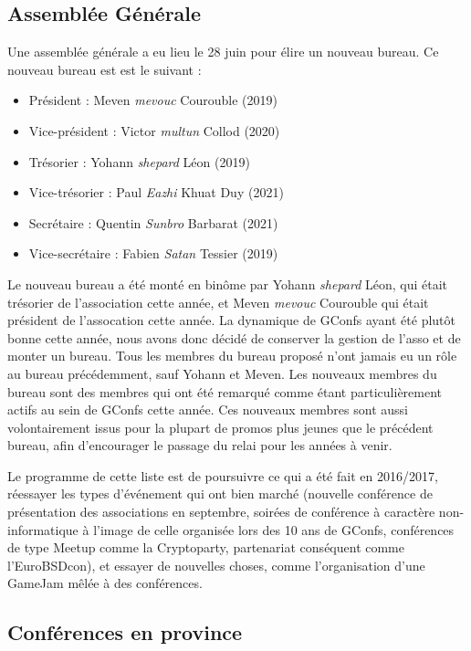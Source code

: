 \documentclass[12pt,a4paper]{article}
\begin{document}
\subsection{Assemblée Générale}

Une assemblée générale a eu lieu le 28 juin pour élire un nouveau bureau. Ce nouveau bureau est est le suivant :

\begin{itemize}
\item Président : Meven \emph{mevouc} Courouble (2019)
\item Vice-président : Victor \emph{multun} Collod (2020)
\item Trésorier : Yohann \emph{shepard} Léon (2019)
\item Vice-trésorier : Paul \emph{Eazhi} Khuat Duy (2021)
\item Secrétaire : Quentin \emph{Sunbro} Barbarat (2021)
\item Vice-secrétaire : Fabien \emph{Satan} Tessier (2019)
\end{itemize}

Le nouveau bureau a été monté en binôme par Yohann \emph{shepard} Léon, qui était
trésorier de l'association cette année, et Meven \emph{mevouc} Courouble qui était président de l'assocation cette année. La dynamique de GConfs ayant été plutôt
bonne cette année, nous avons donc décidé de  conserver la gestion de l'asso et de monter un bureau.
Tous les membres du bureau proposé n'ont jamais eu un rôle au bureau
précédemment, sauf Yohann et Meven. Les nouveaux membres du bureau sont des membres
qui ont été remarqué comme étant particulièrement actifs au sein de GConfs cette année. Ces nouveaux membres sont aussi volontairement issus pour la plupart de promos plus jeunes que le précédent bureau, afin d'encourager le passage du relai pour les années à venir.

Le programme de cette liste est de poursuivre ce qui a été fait en
2016/2017, réessayer les types d'événement qui ont bien marché
(nouvelle conférence de présentation des associations en septembre,
soirées de conférence à caractère non-informatique à l'image de celle organisée lors des 10 ans de GConfs, conférences de type Meetup comme la Cryptoparty, partenariat conséquent comme l'EuroBSDcon), et essayer de nouvelles choses, comme l'organisation d'une GameJam mêlée à des conférences.

\subsection{Conférences en province}
\end{document}

